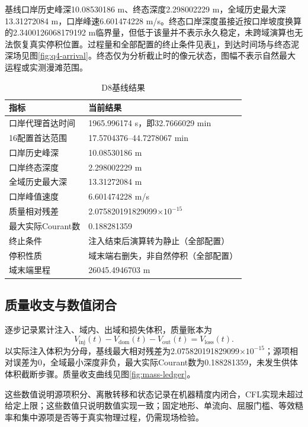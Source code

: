 基线口岸历史峰深10.08530186 m、终态深度2.298002229 m，全域历史最大深13.31272084 m，口岸峰速6.601474228 m/s。终态口岸深度虽接近按口岸坡度换算的2.3400126068179192 m临界量，但低于该量并不表示永久稳定，未跨域演算也无法恢复真实停积位置。过程量和全部配置的终止条件见表\ref{tab:q4-results}，到达时间场与终态泥深场见图\ref{fig:q4-arrival}。终态仅为分析截止时的像元状态，图幅不表示自然最大运程或实测漫滩范围。


\begin{table}[htbp]\centering\small
\caption{D8基线结果}\label{tab:q4-results}
\begin{tabular}{@{}l l@{}}
\toprule
指标&当前结果\\
\midrule
口岸代理首达时间&1965.996174 s，即32.7666029 min\\
16配置首达范围&17.5704376--44.7278067 min\\
口岸历史峰深&10.08530186 m\\
口岸终态深度&2.298002229 m\\
全域历史最大深&13.31272084 m\\
口岸峰值速度&6.601474228 m/s\\
质量相对残差&2.075820191829099$\times10^{-15}$\\
最大实际Courant数&0.188281359\\
终止条件&注入结束后演算转为静止（全部配置）\\
停积性质&域末端右删失，非自然停积（全部配置）\\
域末端里程&26045.4946703 m\\
\bottomrule
\end{tabular}
\end{table}

\subsection{质量收支与数值闭合}
逐步记录累计注入、域内、出域和损失体积，质量账本为
\begin{equation}
V_{\mathrm{inj}}(t)-V_{\mathrm{dom}}(t)-V_{\mathrm{out}}(t)
=V_{\mathrm{loss}}(t).
\end{equation}
以实际注入体积为分母，基线最大相对残差为2.075820191829099$\times10^{-15}$；源项相对误差为0，全域最小深度非负，最大实际Courant数为0.188281359，未发生供体体积截断步骤。质量收支曲线见图\ref{fig:mass-ledger}。

这些数值说明源项积分、离散转移和状态记录在机器精度内闭合，CFL实现未超过给定上限；这些数值只说明数值实现一致；固定地形、单流向、屈服门槛、等效糙率和集中源项是否等于真实物理过程，仍需现场检验。

